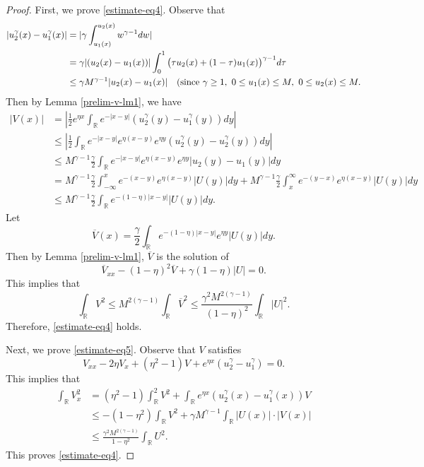 \documentclass[11pt]{article} %
\theoremstyle{remark}
\theoremstyle{remark}
\numberwithin{equation}{section}
\numberwithin{figure}{section}
\numberwithin{table}{section}
\newcommand\RR{\ensuremath{\mathbb{R}}}
\begin{document}
\begin{proof}
First,  we prove \eqref{estimate-eq4}.
Observe that  
\begin{align*}
|u_2^{\gamma} (x)-u_1^\gamma(x)|& =|{\gamma}\int_{u_1(x)}^{u_2(x)} w^{\gamma-1} dw|\\
&=\gamma |(u_2(x)-u_1(x))|\int_0^1 \big(\tau u_2(x)+(1-\tau)u_1(x)\big)^{\gamma -1}d\tau\\
&\le
\gamma M^{\gamma-1}  |u_2(x)-u_1(x)| \quad {\rm (since}\,\, \gamma\ge 1, \,\, 0\le u_1(x)\le M,\,\, 0\le u_2(x)\le M.
\end{align*} 
Then by
Lemma \ref{prelim-v-lm1}, we have
\begin{align*}
|V(x)|&=|\frac{1}{2} e^{\eta x} \int_{\RR} e^{-|x-y|}(u_2^\gamma (y) -u_1^\gamma(y))dy|\\
&\le | \frac{1}{2}\int_{\RR} e^{-|x-y|}e^{\eta (x-y)} e^{\eta y} (u_2^\gamma(y)-u_2^\gamma(y))dy|\\
&\le M^{\gamma-1}  \frac{\gamma}{2} \int_{\RR} e^{-|x-y|}e^{\eta(x-y)} e^{\eta y} |u_2(y)-u_1(y)| dy\\
&=M^{\gamma-1} \frac{\gamma}{2}\int_{-\infty}^ x e^{-(x-y)} e^{\eta(x-y)} |U(y)|dy
+M^{\gamma-1} \frac{\gamma}{2}\int_x^\infty e^{-(y-x)} e^{\eta(x-y)} |U(y)|dy\\
&\le M^{\gamma-1}\frac{\gamma}{2}\int_{\RR} e^{-(1-\eta)|x-y|} |U(y)|dy.
\end{align*}
Let
$$
\overline V(x)=\frac{\gamma}{2}\int_{\RR} e^{-(1-\eta)|x-y|} e^{\eta y}|U(y)|dy.
$$
Then by Lemma \ref{prelim-v-lm1}, $\overline V$ is the solution of
$$
\overline V_{xx}-(1-\eta)^2\overline V+\gamma(1-\eta)|U|=0.
$$ 
This implies that
$$
\int_{\RR} V^2\le M^{2(\gamma-1)} \int_{\RR} \overline V^2 \le \frac{\gamma^2 M^{2(\gamma-1)}}{(1-\eta)^2}\int_{\RR}|U|^2.
$$
Therefore, \eqref{estimate-eq4} holds.


Next,  we prove \eqref{estimate-eq5}. Observe that $V$ satisfies
$$
V_{xx}-2\eta V_x+(\eta^2 -1)V +e^{\eta x}(u_2^\gamma-u_1^\gamma)=0.
$$
This implies that
\begin{align*}
\int_{\RR} V_x^2&=(\eta^2 -1)\int_{\RR}^2 V^2+\int_{\RR} e^{\eta x}(u_2^\gamma(x)-u_1^\gamma(x)) V\\
&\le -(1-\eta^2)\int_{\RR}V^2+\gamma M^{\gamma-1}\int_{\RR} |U(x)|\cdot |V(x)|\\
&\le \frac{\gamma^2 M^{2(\gamma-1)}}{1-\eta^2}\int_{\RR} U^2.
\end{align*}
This proves \eqref{estimate-eq4}.
\end{proof}
\end{document}
